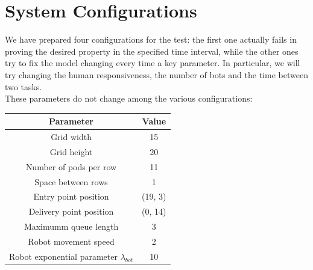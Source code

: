 \documentclass{article}
\begin{document}
	\section{System Configurations}
		We have prepared four configurations for the test: the first one actually fails in proving the desired property in the specified time interval, while the other ones try to fix the model changing every time a key parameter. In particular, we will try changing the human responsiveness, the number of bots and the time between two tasks.\\
		These parameters do not change among the various configurations:
		\begin{center}
			\begin{tabular}{ |c|c|}
				\hline
				Parameter & Value \\
				\hline
				\hline
				Grid width & 15\\
				\hline
				Grid height & 20\\
				\hline
				Number of pods per row & 11\\
				\hline
				Space between rows & 1 \\
				\hline
				Entry point position & (19, 3) \\
				\hline
				Delivery point position & (0, 14) \\
				\hline
				Maximumm queue length & 3 \\
				\hline
				Robot movement speed & 2 \\
				\hline
				Robot exponential parameter $\lambda_{bot}$ & 10 \\
				\hline
			\end{tabular}
		\end{center}
			
\end{document}
